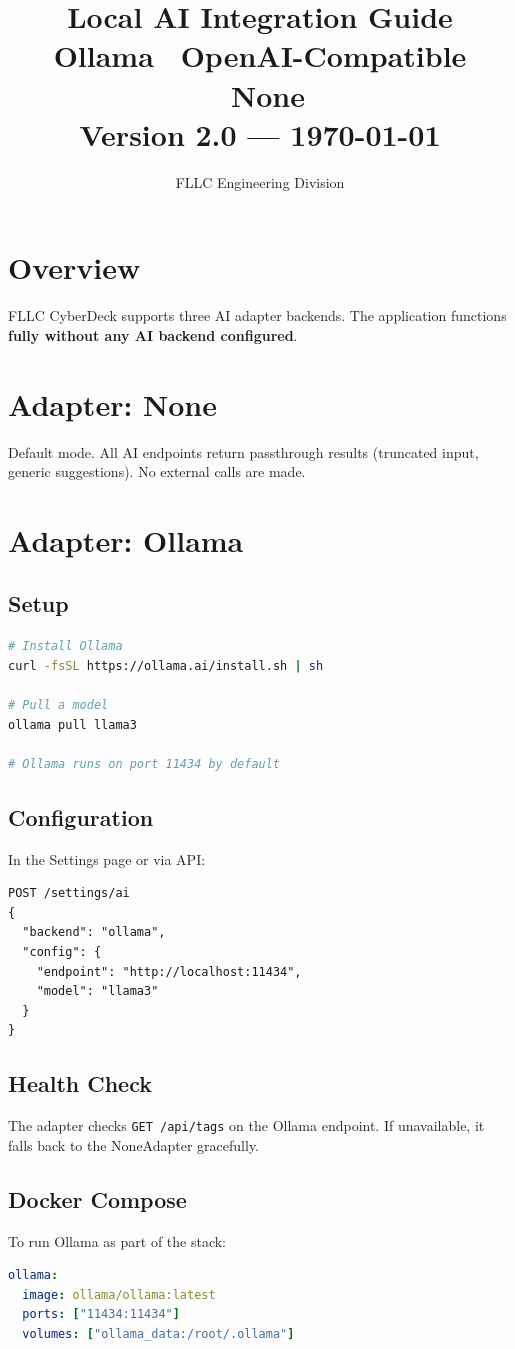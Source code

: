 \documentclass[11pt,a4paper]{article}
\title{%
  {\Huge\bfseries\textcolor{cyber}{Local AI Integration Guide}}\\[6pt]
  {\Large Ollama \textbullet\ OpenAI-Compatible \textbullet\ None}\\[4pt]
  {\normalsize Version 2.0 --- \today}
}
\author{FLLC Engineering Division}
\date{}
\begin{document}
\maketitle\thispagestyle{fancy}
\tableofcontents\newpage

\section{Overview}
FLLC CyberDeck supports three AI adapter backends.  The application functions
\textbf{fully without any AI backend configured}.

\section{Adapter: None}
Default mode.  All AI endpoints return passthrough results (truncated input,
generic suggestions).  No external calls are made.

\section{Adapter: Ollama}
\subsection{Setup}
\begin{lstlisting}[language=bash]
# Install Ollama
curl -fsSL https://ollama.ai/install.sh | sh

# Pull a model
ollama pull llama3

# Ollama runs on port 11434 by default
\end{lstlisting}

\subsection{Configuration}
In the Settings page or via API:
\begin{lstlisting}
POST /settings/ai
{
  "backend": "ollama",
  "config": {
    "endpoint": "http://localhost:11434",
    "model": "llama3"
  }
}
\end{lstlisting}

\subsection{Health Check}
The adapter checks \texttt{GET /api/tags} on the Ollama endpoint.
If unavailable, it falls back to the NoneAdapter gracefully.

\subsection{Docker Compose}
To run Ollama as part of the stack:
\begin{lstlisting}[language=yaml]
ollama:
  image: ollama/ollama:latest
  ports: ["11434:11434"]
  volumes: ["ollama_data:/root/.ollama"]
\end{lstlisting}
\end{document}
